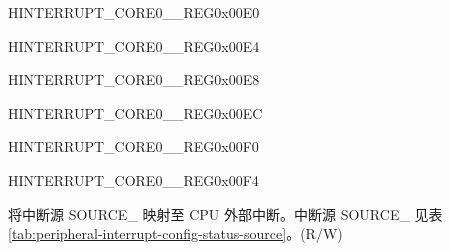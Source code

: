 \begin{register}{H}{INTERRUPT\_CORE0\_\_REG}{0x00E0}\label{regdesc:INTERRUPTCORE0CORE0IRAM0PMSMONITORVIOLATEINTRMAPREG}






\end{register}\vspace{-3em}


\begin{register}{H}{INTERRUPT\_CORE0\_\_REG}{0x00E4}\label{regdesc:INTERRUPTCORE0CORE0DRAM0PMSMONITORVIOLATEINTRMAPREG}






\end{register}\vspace{-3em}


\begin{register}{H}{INTERRUPT\_CORE0\_\_REG}{0x00E8}\label{regdesc:INTERRUPTCORE0CORE0PIFPMSMONITORVIOLATEINTRMAPREG}






\end{register}\vspace{-3em}


\begin{register}{H}{INTERRUPT\_CORE0\_\_REG}{0x00EC}\label{regdesc:INTERRUPTCORE0CORE0PIFPMSMONITORVIOLATESIZEINTRMAPREG}






\end{register}\vspace{-3em}


\begin{register}{H}{INTERRUPT\_CORE0\_\_REG}{0x00F0}\label{regdesc:INTERRUPTCORE0BACKUPPMSVIOLATEINTRMAPREG}






\end{register}\vspace{-3em}


\begin{register}{H}{INTERRUPT\_CORE0\_\_REG}{0x00F4}\label{regdesc:INTERRUPTCORE0CACHECORE0ACSINTMAPREG}
%
%
\regnewline%
\begin{regdesc}\begin{reglist}
\label{fielddesc:INTERRUPTCORE0CACHECORE0ACSINTMAP}\item [INTERRUPT\_CORE0\_SOURCE\_\regindex{X}\_MAP] 将中断源 SOURCE\_ 映射至 CPU 外部中断。中断源 SOURCE\_ 见表 \ref{tab:peripheral-interrupt-config-status-source}。(R/W)
\end{reglist}\end{regdesc}
\end{register}


